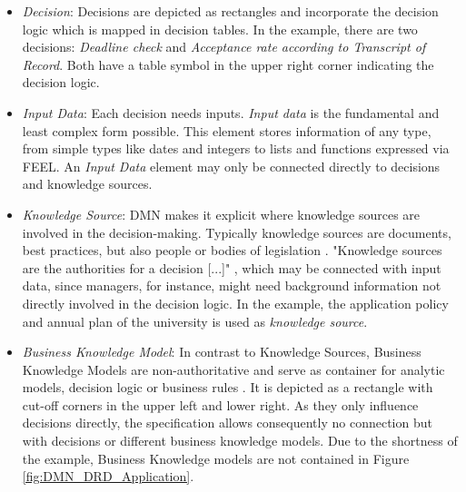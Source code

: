 \begin{itemize}
\item \textit{Decision}: Decisions are depicted as rectangles and incorporate the decision logic which is mapped in decision tables. In the example, there are two decisions: \textit{Deadline check} and \textit{Acceptance rate according to Transcript of Record}. Both have a table symbol in the upper right corner indicating the decision logic. 
\item \textit{Input Data}: Each decision needs inputs. \textit{Input data} is the fundamental and least complex form possible. This element stores information of any type, from simple types like dates and integers to lists and functions expressed via \acf{FEEL}. An \textit{Input Data} element may only be connected directly to decisions and knowledge sources. 
\item \textit{Knowledge Source}: DMN makes it explicit where knowledge sources are involved in the decision-making. Typically knowledge sources are documents, best practices, but also people or bodies of legislation \cite{DMNspec2016}. "Knowledge sources are the authorities for a decision [...]" \cite{DMNmicroguide}, which may be connected with input data, since managers, for instance, might need background information not directly involved in the decision logic. In the example, the application policy and annual plan of the university is used as \textit{knowledge source}.
\item \textit{Business Knowledge Model}: In contrast to Knowledge Sources, Business Knowledge Models are non-authoritative and serve as container for analytic models, decision logic or business rules \cite{DMNspec2016}. It is depicted as a rectangle with cut-off corners in the upper left and lower right. As they only influence decisions directly, the specification allows consequently no connection but with decisions or different business knowledge models. Due to the shortness of the example, Business Knowledge models are not contained in Figure  \ref{fig:DMN_DRD_Application}. 
\end{itemize}


